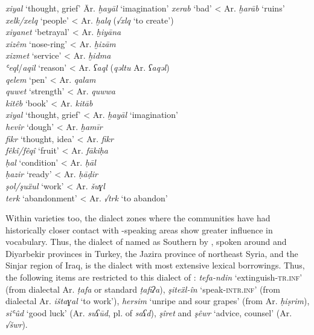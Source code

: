 \documentclass[output=paper]{langsci/langscibook}
\begin{document}
\ea
\begin{tabbing}
\textit{xiyal} ‘thought, grief’ \= Ar. \textit{ḫayāl} ‘imagination’\kill
\textit{xerab} ‘bad’     \> < Ar. \textit{ḫarāb} ‘ruins’\\
\textit{xelk/xelq} ‘people’  \> < Ar. \textit{ḫalq} (\textit{√xlq} ‘to create’)\\
\textit{xiyanet} ‘betrayal’  \> < Ar. \textit{ḫiyāna} \\
\textit{xizêm} ‘nose-ring’  \> < Ar. \textit{ḫizām}\\
\textit{xizmet} ‘service’  \> < Ar. \textit{ḫidma} \\
\textit{ʿeql}/\textit{aqil} ‘reason’  \> < Ar. \textit{ʕaql} (\textit{qəltu} Ar. \textit{ʕaqəl})\\
\textit{qelem} ‘pen’    \> < Ar. \textit{qalam}\\
\textit{quwet} ‘strength’  \> < Ar. \textit{quwwa}\\
\textit{kitêb} ‘book’    \> < Ar. \textit{kitāb}\\
\textit{xiyal} ‘thought, grief’  \> < Ar. \textit{ḫayāl} ‘imagination’\\
\textit{hevîr} ‘dough’    \> < Ar. \textit{ḫamīr} \\
\textit{fikr} ‘thought, idea’  \> < Ar. \textit{fikr}\\
\textit{fêkî/fêqî} ‘fruit’  \> < Ar. \textit{fākiḥa}\\
\textit{ḥal} ‘condition’  \> < Ar. \textit{ḥāl} \\
\textit{ḥazir} ‘ready’    \> < Ar. \textit{ḥāḍir}\\
\textit{şol/şuẍul} ‘work’  \> < Ar. \textit{šuɣl} \\
\textit{terk} ‘abandonment’  \> < Ar. \textit{√trk} ‘to abandon’
\end{tabbing}
\z

Within varieties too, the dialect zones where the communities have had historically closer contact with -speaking areas show greater  influence in vocabulary. Thus, the dialect of  named as Southern  by  \citet{ÖpenginHaig2014}, spoken around  and Diyarbekir provinces in Turkey, the Jazira province of northeast Syria, and the Sinjar region of Iraq, is the dialect with most extensive  lexical borrowings. Thus, the following items are restricted to this dialect of : \textit{tefa-ndin} ‘extinguish-\textsc{tr.inf}’ (from dialectal Ar. \textit{ṭafa} or standard \textit{ṭafiʔa}), \textit{şiteẍl-în} ‘speak-\textsc{intr.inf}’ (from dialectal Ar. \textit{ištaɣal} ‘to work’), \textit{hersim} ‘unripe and sour grapes’ (from Ar. \textit{ḥiṣrim}), \textit{siʿûd} ‘good luck’ (Ar. \textit{suʕūd}, pl. of \textit{saʕd}), \textit{şîret} and \textit{şêwr} ‘advice, counsel’ (Ar. \textit{√šwr}).     
\end{document}
